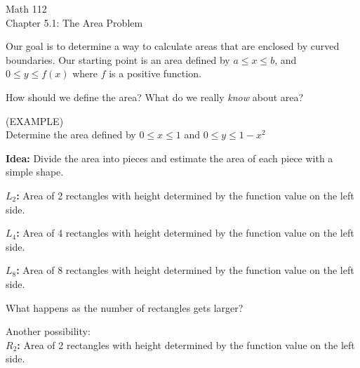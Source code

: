 \documentclass[11pt]{article}
\begin{document}
\begin{center}
\Large
\rm{Math 112}
\\
\rm{Chapter 5.1:  The Area Problem}
\\
\end{center}
\vspace{0.2in}

Our goal is to determine a way to calculate areas that are enclosed by curved boundaries.  Our starting point is an area
defined by $a \leq x \leq b$, and $0 \leq y \leq f(x)$  where $f$ is a positive function.\\

\vspace{2.2in}


How should we define the area?  What do we really \emph{know} about area? \\

\vspace{1.in}


(EXAMPLE) \\

Determine the area defined by $ 0 \leq x \leq 1$  and $0 \leq y \leq 1-x^2$

\vspace{2.5in}


       {\bf Idea:} Divide the area into pieces and estimate the area of each piece with a simple shape.


       
\pagebreak
{\bf $L_2$:} Area of 2 rectangles with height determined by the function value on the left side.       
       
\vspace{2.5in}

{\bf $L_4$:} Area of 4 rectangles with height determined by the function value on the left side.       

\vspace{2.5in}


{\bf $L_8$:} Area of 8 rectangles with height determined by the function value on the left side.       

\vspace{1.5in}

What happens as the number of rectangles gets larger?


\pagebreak

Another possibility:\\

{\bf $R_2$:} Area of 2 rectangles with height determined by the function value on the left side.       
       
\end{document}
